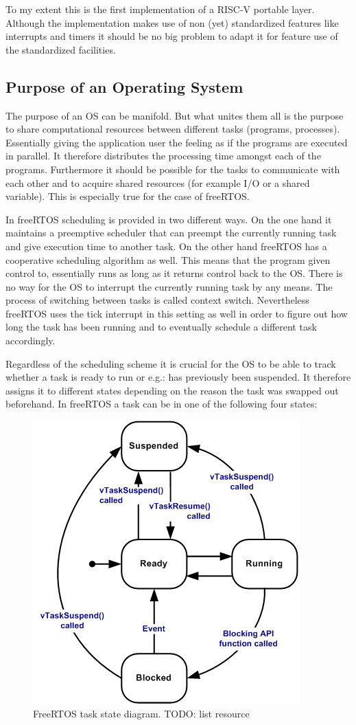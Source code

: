 To my extent this is the first implementation of a RISC-V portable layer. Although the implementation makes use of non (yet) standardized features like interrupts and timers it should be no big problem to adapt it for feature use of the standardized facilities.

\subsection{Purpose of an Operating System}

The purpose of an OS can be manifold. But what unites them all is the purpose to share computational resources between different tasks (programs, processes). Essentially giving the application user the feeling as if the programs are executed in parallel. It therefore distributes the processing time amongst each of the programs. Furthermore it should be possible for the tasks to communicate with each other and to acquire shared resources (for example I/O or a shared variable). This is especially true for the case of freeRTOS.

In freeRTOS scheduling is provided in two different ways. On the one hand it maintains a preemptive scheduler that can preempt the currently running task and give execution time to another task. On the other hand freeRTOS has a cooperative scheduling algorithm as well. This means that the program given control to, essentially runs as long as it returns control back to the OS. There is no way for the OS to interrupt the currently running task by any means. The process of switching between tasks is called context switch. Nevertheless freeRTOS uses the tick interrupt in this setting as well in order to figure out how long the task has been running and to eventually schedule a different task accordingly.

Regardless of the scheduling scheme it is crucial for the OS to be able to track whether a task is ready to run or e.g.: has previously been suspended. It therefore assigns it to different states depending on the reason the task was swapped out beforehand. In freeRTOS a task can be in one of the following four states:

\begin{figure}[htbp]
 \centering
 \includegraphics[width=0.6\linewidth]{./figures/tskstate.png}
 \caption{FreeRTOS task state diagram. TODO: list resource}
 \label{fig:task_states}
\end{figure}



